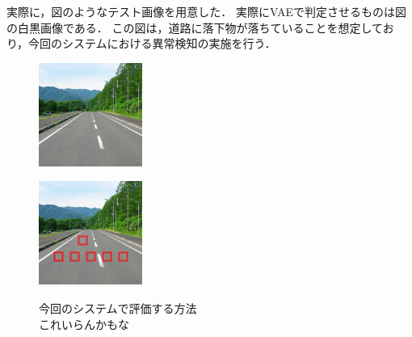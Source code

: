 \documentclass[paper]{ieicej}
\begin{document}
実際に，図のようなテスト画像を用意した．
実際にVAEで判定させるものは図の白黒画像である．
この図は，道路に落下物が落ちていることを想定しており，今回のシステムにおける異常検知の実施を行う．

\begin{figure}[tb]
  \begin{minipage}[]{0.49\columnwidth}
    \centering
    \includegraphics[width=0.9\columnwidth]{figures/Ex_re_2.png}
    \label{fig:3-1-2}
  \end{minipage}
  \begin{minipage}[]{0.49\linewidth}
    \centering
    \includegraphics[width=0.9\columnwidth]{figures/Ex_re_1.png}
    \label{fig:3-1-3}
  \end{minipage}
  \caption{今回のシステムで評価する方法\\これいらんかもな}
  \label{fig:3-1-1}
\end{figure}
\end{document}
